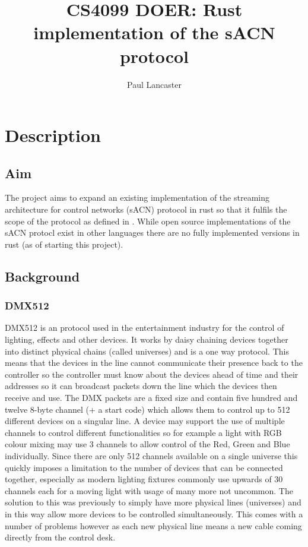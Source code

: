 \documentclass[12pt,a4paper,notitlepage]{report}
\author{Paul Lancaster}
\title{CS4099 DOER: Rust implementation of the sACN protocol}
\begin{document}
	\maketitle
\section*{Description}
\subsection*{Aim}
The project aims to expand an existing implementation \cite{ORIGNIAL_IMPL} of the streaming architecture for control networks (sACN) protocol \cite{ANSI_E1.17} in rust so that it fulfils the scope of the protocol as defined in \cite{ANSI_E1.31}. While open source implementations of the sACN protocl exist in other languages \cite{C_IMPL} there are no fully implemented versions in rust (as of starting this project). 
\subsection*{Background}
\subsubsection*{DMX512} DMX512 is an protocol used in the entertainment industry for the control of lighting, effects and other devices. It works by daisy chaining devices together into distinct physical chains (called universes) and is a one way protocol. This means that the devices in the line cannot communicate their presence back to the controller so the controller must know about the devices ahead of time and their addresses so it can broadcast packets down the line which the devices then receive and use. The DMX packets are a fixed size and contain five hundred and twelve 8-byte channel (+ a start code) which allows them to control up to 512 different devices on a singular line. A device may support the use of multiple channels to control different functionalities so for example a light with RGB colour mixing may use 3 channels to allow control of the Red, Green and Blue individually. Since there are only 512 channels available on a single universe this quickly imposes a limitation to the number of devices that can be connected together, especially as modern lighting fixtures commonly use upwards of 30 channels each for a moving light with usage of many more not uncommon. The solution to this was previously to simply have more physical lines (universes) and in this way allow more devices to be controlled simultaneously. This comes with a number of problems however as each new physical line means a new cable coming directly from the control desk.
\end{document}
